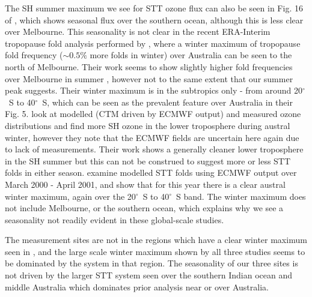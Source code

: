 \documentclass[acp, manuscript]{copernicus} %
\begin{document}
  The SH summer maximum we see for STT ozone flux can also be seen in Fig. 16 of \cite{Skerlak2014}, which shows seasonal flux over the southern ocean, although this is less clear over Melbourne.
  This seasonality is not clear in the recent ERA-Interim tropopause fold analysis performed by \citet{Skerlak2015}, where a winter maximum of tropopause fold frequency ($\sim 0.5\%$ more folds in winter) over Australia can be seen to the north of Melbourne.
  Their work seems to show slightly higher fold frequencies over Melbourne in summer \citep[][Fig. 5]{Skerlak2015}, however not to the same extent that our summer peak suggests.
  Their winter maximum is in the subtropics only - from around 20$^{\circ}$~S to 40$^{\circ}$~S, which can be seen as the prevalent feature over Australia in their Fig. 5.
  \cite{Wauben1998} look at modelled (CTM driven by ECMWF output) and measured ozone distributions and find more SH ozone in the lower troposphere during austral winter, however they note that the ECMWF fields are uncertain here again due to lack of measurements.
  Their work shows a generally cleaner lower troposphere in the SH summer but this can not be construed to suggest more or less STT folds in either season.
  \cite{Sprenger2003} examine modelled STT folds using ECMWF output over March 2000 - April 2001, and show that for this year there is a clear austral winter maximum, again over the 20$^{\circ}$~S to 40$^{\circ}$~S band.
  The winter maximum does not include Melbourne, or the southern ocean, which explains why we see a seasonality not readily evident in these global-scale studies.
  
  The measurement sites are not in the regions which have a clear winter maximum seen in \cite[Fig. 1][]{Sprenger2003}, and the large scale winter maximum shown by all three studies seems to be dominated by the system in that region.
  The seasonality of our three sites is not driven by the larger STT system seen over the southern Indian ocean and middle Australia which dominates prior analysis near or over Australia.
  
\end{document}
